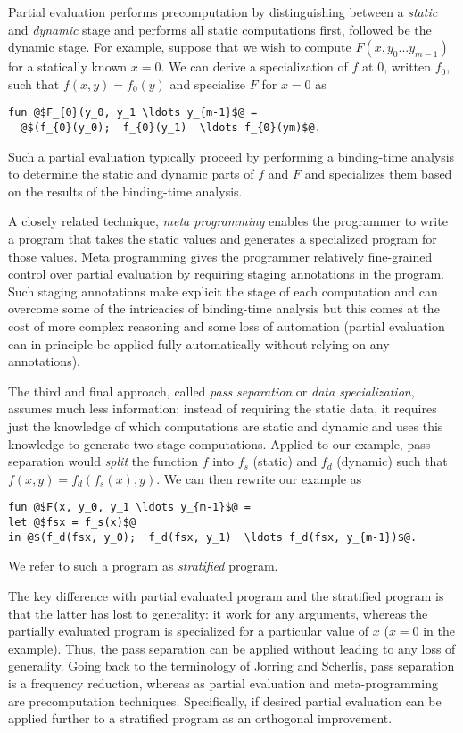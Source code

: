 Partial evaluation performs precomputation by distinguishing between a
{\em static} and {\em dynamic} stage and performs all static
computations first, followed be the dynamic stage.  For example,
suppose that we wish to compute $F(x, y_0 \ldots y_{m-1})$ for a
statically known $x = 0$.  We can derive a specialization of $f$ at
$0$, written $f_0$, such that $f(x,y) = f_{0}(y)$ and specialize $F$
for $x=0$ as
\begin{lstlisting}
fun @$F_{0}(y_0, y_1 \ldots y_{m-1}$@ = 
  @$(f_{0}(y_0);  f_{0}(y_1)  \ldots f_{0}(ym)$@.
\end{lstlisting}
%
Such a partial evaluation typically proceed by performing a
binding-time analysis to determine the static and dynamic parts of $f$
and $F$ and specializes them based on the results of the binding-time
analysis.

A closely related technique, {\em meta programming} enables the
programmer to write a program that takes the static values and
generates a specialized program for those values.  Meta programming
gives the programmer relatively fine-grained control over partial
evaluation by requiring staging annotations in the program.  Such
staging annotations make explicit the stage of each computation and
can overcome some of the intricacies of binding-time analysis but this
comes at the cost of more complex reasoning and some loss of
automation (partial evaluation can in principle be applied fully
automatically without relying on any annotations).

The third and final approach, called {\em pass separation} or {\em
  data specialization}, assumes much less information: instead of
requiring the static data, it requires just the knowledge of which
computations are static and dynamic and uses this knowledge to
generate two stage computations. 
%
Applied to our example, pass separation would {\em split} the function
$f$ into $f_s$ (static) and $f_d$ (dynamic) such that $f(x,y) =
f_d(f_s(x),y)$.  We can then rewrite our example as
%
\begin{lstlisting}
fun @$F(x, y_0, y_1 \ldots y_{m-1}$@ = 
let @$fsx = f_s(x)$@
in @$(f_d(fsx, y_0);  f_d(fsx, y_1)  \ldots f_d(fsx, y_{m-1})$@.
\end{lstlisting}
We refer to such a program as {\em stratified} program.

The key difference with partial evaluated program and the stratified
program is that the latter has lost to generality: it work for any
arguments, whereas the partially evaluated program is specialized for
a particular value of $x$ ($x = 0$ in the example).  Thus, the pass
separation can be applied without leading to any loss of generality.
Going back to the terminology of Jorring and Scherlis, pass separation
is a frequency reduction, whereas as partial evaluation and
meta-programming are precomputation techniques.  Specifically, if
desired partial evaluation can be applied further to a stratified
program as an orthogonal improvement.

